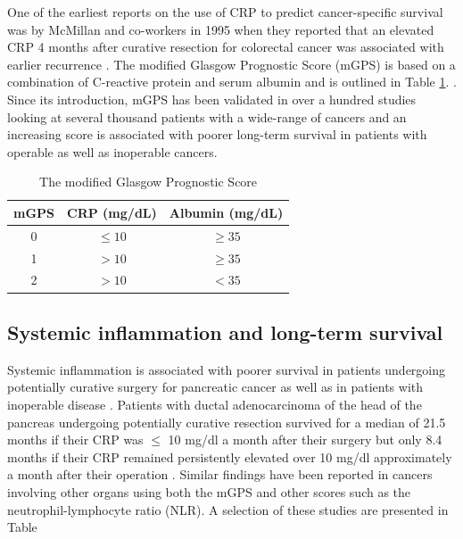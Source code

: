 One of the earliest reports on the use of CRP to predict cancer-specific survival was by McMillan and co-workers in 1995 when they reported that an elevated CRP 4 months after curative resection for colorectal cancer was associated with earlier recurrence \parencite{mcmillan_prospective_1995}. 
The modified Glasgow Prognostic Score (mGPS)\parencite{elahi_score_2004} is based on a combination of C-reactive protein and serum albumin and is outlined in Table \ref{table:mGPS}. . 
Since its introduction, mGPS has been validated in over a hundred studies looking at several thousand patients with a wide-range of cancers and an increasing score is associated with poorer long-term survival in patients with operable as well as inoperable cancers.

\begin{table}[h]
	\centering
	\caption{The modified Glasgow Prognostic Score}
	\label{table:mGPS}
	\begin{tabular}{c c c}
		mGPS & CRP (mg/dL) & Albumin (mg/dL) \\ \hline
		 0  & $\leq 10$  & $\geq 35$    \\
		 1  & $> 10$   & $\geq 35$    \\
		 2  & $> 10$   & $< 35$
	\end{tabular}
\end{table}

\subsection{Systemic inflammation and long-term survival}
Systemic inflammation is associated with poorer survival in patients undergoing potentially curative surgery for pancreatic cancer \parencite{jamieson_systemic_2005,clark_preoperative_2007,bhatti_preoperative_2010} as well as in patients with inoperable disease \parencite{glen_evaluation_2006}. 
Patients with ductal adenocarcinoma of the head of the pancreas undergoing potentially curative resection survived for a median of 21.5 months if their CRP was $\leq$ 10 mg/dl a month after their surgery but only 8.4 months if their CRP remained persistently elevated over 10 mg/dl approximately a month after their operation \parencite{jamieson_systemic_2005}. 
Similar findings have been reported in cancers involving other organs using both the mGPS and other scores such as the neutrophil-lymphocyte ratio (NLR). 
A selection of these studies are presented in Table %

